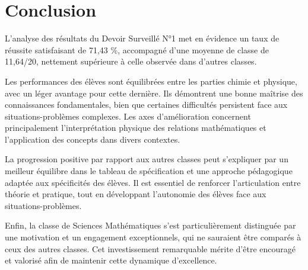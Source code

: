 \documentclass[12pt]{article}
\begin{document}
\begin{center}
\end{center}

\section{Conclusion}

L’analyse des résultats du Devoir Surveillé N°1 met en évidence un taux de réussite satisfaisant de 71,43 \%, accompagné d’une moyenne de classe de 11,64/20, nettement supérieure à celle observée dans d’autres classes.

Les performances des élèves sont équilibrées entre les parties chimie et physique, avec un léger avantage pour cette dernière. Ils démontrent une bonne maîtrise des connaissances fondamentales, bien que certaines difficultés persistent face aux situations-problèmes complexes. Les axes d’amélioration concernent principalement l’interprétation physique des relations mathématiques et l’application des concepts dans divers contextes.

La progression positive par rapport aux autres classes peut s’expliquer par un meilleur équilibre dans le tableau de spécification et une approche pédagogique adaptée aux spécificités des élèves. Il est essentiel de renforcer l’articulation entre théorie et pratique, tout en développant l’autonomie des élèves face aux situations-problèmes.

Enfin, la classe de Sciences Mathématiques s’est particulièrement distinguée par une motivation et un engagement exceptionnels, qui ne sauraient être comparés à ceux des autres classes. Cet investissement remarquable mérite d’être encouragé et valorisé afin de maintenir cette dynamique d’excellence.
\end{document}
